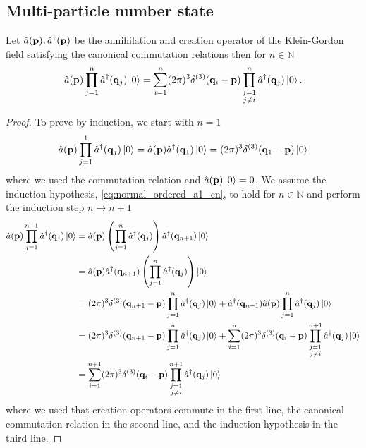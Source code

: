 \subsection{Multi-particle number state}

\begin{lemma}\label{th:normal_ordered_a1_cn}
	Let $\hat{a}(\vb{p}),\hat{a}^\dagger(\vb{p})$ be the annihilation and creation operator of the Klein-Gordon field satisfying the canonical commutation relations then for $n\in\mathbb{N}$
	\begin{equation}
		\hat{a}(\vb{p})
		\prod_{j=1}^n
		\hat{a}^\dagger(\vb{q}_j)
		\ket{0}
		=
		\sum_{i=1}^n
		(2\pi)^3
		\delta^{(3)}(\vb{q}_i-\vb{p})
		\prod_{\substack{j=1\\j\neq i}}^n
		\hat{a}^\dagger(\vb{q}_j)
		\ket{0}
		\label{eq:normal_ordered_a1_cn}
		.
	\end{equation}
\end{lemma}
\begin{proof}
	To prove by induction, we start with $n=1$
	\begin{equation*}
		\hat{a}(\vb{p})
		\prod_{j=1}^1
		\hat{a}^\dagger(\vb{q}_j)
		\ket{0}
		=
		\hat{a}(\vb{p})
		\hat{a}^\dagger(\vb{q}_1)
		\ket{0}
		=
		(2\pi)^3
		\delta^{(3)}(\vb{q}_1-\vb{p})
		\ket{0}
	\end{equation*}
	where we used the commutation relation and $\hat{a}(\vb{p})\ket{0}=0$.
	We assume the induction hypothesis, \cref{eq:normal_ordered_a1_cn}, to hold for $n\in\mathbb{N}$ and perform the induction step $n\to n+1$
	\begin{equation*}
		\begin{split}
			\hat{a}(\vb{p})
			\prod_{j=1}^{n+1}
			\hat{a}^\dagger(\vb{q}_j)
			\ket{0}
			&=
			\hat{a}(\vb{p})
			\left(
				\prod_{j=1}^n
				\hat{a}^\dagger(\vb{q}_j)
			\right)
			\hat{a}^\dagger(\vb{q}_{n+1})
			\ket{0}
			\\
			&=
			\hat{a}(\vb{p})
			\hat{a}^\dagger(\vb{q}_{n+1})
			\left(
				\prod_{j=1}^n
				\hat{a}^\dagger(\vb{q}_j)
			\right)
			\ket{0}
			\\
			&=
			(2\pi)^3
			\delta^{(3)}(\vb{q}_{n+1}-\vb{p})
			\prod_{j=1}^n
			\hat{a}^\dagger(\vb{q}_j)
			\ket{0}
			+
			\hat{a}^\dagger(\vb{q}_{n+1})
			\hat{a}(\vb{p})
			\prod_{j=1}^n
			\hat{a}^\dagger(\vb{q}_j)
			\ket{0}
			\\
			&=
			(2\pi)^3
			\delta^{(3)}(\vb{q}_{n+1}-\vb{p})
			\prod_{j=1}^n
			\hat{a}^\dagger(\vb{q}_j)
			\ket{0}
			+
			\sum_{i=1}^n
			(2\pi)^3
			\delta^{(3)}(\vb{q}_i-\vb{p})
			\prod_{\substack{j=1\\j\neq i}}^{n+1}
			\hat{a}^\dagger(\vb{q}_j)
			\ket{0}
			\\
			&=
			\sum_{i=1}^{n+1}
			(2\pi)^3
			\delta^{(3)}(\vb{q}_i-\vb{p})
			\prod_{\substack{j=1\\j\neq i}}^{n+1}
			\hat{a}^\dagger(\vb{q}_j)
			\ket{0}
		\end{split}
	\end{equation*}
	where we used that creation operators commute in the first line, the canonical commutation relation in the second line, and the induction hypothesis in the third line.
\end{proof}

